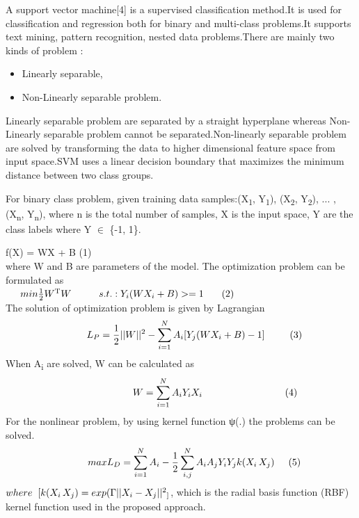 \documentclass[a4paper, 10pt, conference]{ieeeconf}      %
\begin{document}
A support vector machine[4] is a supervised classification method.It is used for classification and regression both for binary and multi-class problems.It supports text mining, pattern recognition, nested data problems.There are mainly two kinds of problem : \begin{itemize}
\item Linearly separable, 
\item Non-Linearly separable problem.
\end{itemize}
Linearly separable problem are separated by a straight hyperplane whereas Non-Linearly separable problem cannot be separated.Non-linearly separable problem are solved by transforming the data to higher dimensional feature space from input space.SVM uses a linear decision boundary that maximizes the minimum distance between two class groups.
\par
For binary class problem, given training data samples:(X\textsubscript{1}, Y\textsubscript{1}), (X\textsubscript{2}, Y\textsubscript{2}), ... , (X\textsubscript{n}, Y\textsubscript{n}), where  n is the total number of samples, X is the input space, Y are the class labels where Y $\in$ \{-1, 1\}.

\hspace{2.5cm}f(X) = WX + B \hspace{3cm}(1) \\
where W and B are parameters of the model.
The optimization problem can be formulated as \\

$\hspace{0.5cm} min\frac{1}{2}W\textsuperscript{T}W\hspace{1cm}
s.t.:Y_{i}(WX_{i}+B) >=1 \hspace{0.65cm}(2)$ \\

The solution of optimization problem is given by Lagrangian 
\[\hspace{1cm}L_{P} = \frac{1}{2}||W||\textsuperscript{2} - \sum_{i=1}^{N} A_{i}[Y_{j}(WX_{i}+B) -1]  \hspace{0.9cm}(3) \]
When A\textsubscript{i} are solved, W can be calculated as 
\[\hspace{2.5cm}W = \sum_{i=1}^{N} A_{i}Y_{i}X_{i} \hspace{3cm}(4)\]   
For the nonlinear problem, by using kernel function ψ(.) the problems can be solved. 
\[\hspace{1cm}max L_{D} = \sum_{i=1}^{N} A_{i} - \frac{1}{2}\sum_{i,j}^{N} A_{i}A_{j}Y_{i}Y_{j}k(X_{i}\,X_{j}) \hspace{0.5cm}(5)\] 
$where\hspace{0.2cm}[k(X_{i}\,X_{j})= exp(\Gamma||X_{i}-X_{j}||\textsuperscript{2}_]$, which is the radial basis function (RBF) kernel function used in the proposed approach.
\end{document}
